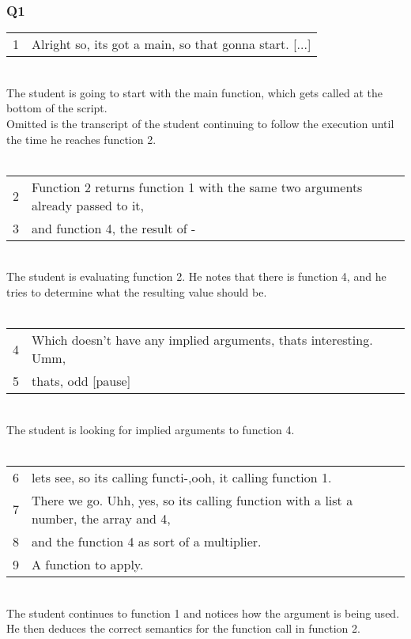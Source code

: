 \subsubsection{Q1}
\begin{tabular}{lp{13cm}}
1& Alright so, its got a main, so that gonna start. [...]\\
\end{tabular}\\
The student is going to start with the main function, which gets called at the bottom of the script. \\
Omitted is the transcript of the student continuing to follow the execution until the time he reaches function 2. \\ \\
\begin{tabular}{lp{13cm}}
2& Function 2 returns function 1 with the same two arguments already passed to it,\\
3&and function 4, the result of - \\
\end{tabular}\\
The student is evaluating function 2.
He notes that there is function 4, and he tries to determine what the resulting value should be. \\ \\
\begin{tabular}{lp{13cm}}
4&Which doesn't have any implied arguments, thats interesting. Umm, \\
5& thats, odd [pause] \\
\end{tabular}\\
The student is looking for implied arguments to function 4. \\ \\
\begin{tabular}{lp{13cm}}
6& lets see, so its calling functi-,ooh, it calling function 1.\\
7&There we go. Uhh, yes, so its calling function with a list a number, the array and 4,\\
8&and the function 4 as sort of a multiplier.\\
9&A function to apply. \\
\end{tabular}\\
The student continues to function 1 and notices how the argument is being used.
He then deduces the correct semantics for the function call in function 2. \\

